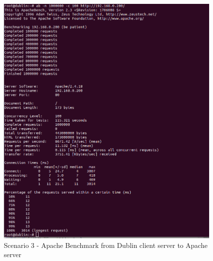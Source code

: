 \documentclass{article}
\begin{document}
\begin{figure}[H]
\includegraphics[width=14cm]{figures/dublin-ab.png}
\centering
\caption{Scenario 3 - Apache Benchmark from Dublin client server to Apache server}
\centering
\label{fig:ab_dublin_scenario_3}
\end{figure}
\end{document}
